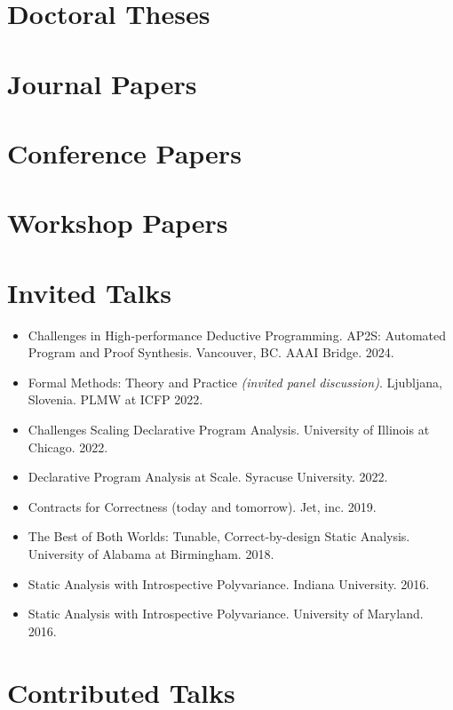 \documentclass[line]{res}
\begin{document}
\begin{resume}
\section{\large Doctoral Theses} \vspace{0.3cm}

\vspace{-0.4cm}

\section{\large Journal Papers} \vspace{0.3cm}

\vspace{-0.4cm}

\section{\large Conference Papers} \vspace{0.3cm}

\vspace{-0.4cm}

\section{\large Workshop Papers} \vspace{0.3cm}

\vspace{-0.4cm}

\section{\large Invited Talks} \vspace{0.2in}
\begin{itemize}
\item Challenges in High-performance Deductive Programming. AP2S: Automated Program and Proof Synthesis. Vancouver, BC. AAAI Bridge. 2024. 
\item Formal Methods: Theory and Practice \textit{(invited panel discussion)}. Ljubljana, Slovenia. PLMW at ICFP 2022.
\item Challenges Scaling Declarative Program Analysis. University of Illinois at Chicago. 2022.
\item Declarative Program Analysis at Scale. Syracuse University. 2022.
\item Contracts for Correctness (today and tomorrow). Jet, inc. 2019.
\item The Best of Both Worlds: Tunable, Correct-by-design Static Analysis. University of Alabama at Birmingham. 2018.
\item Static Analysis with Introspective Polyvariance. Indiana University. 2016.
\item Static Analysis with Introspective Polyvariance. University of Maryland. 2016.
\end{itemize}

\section{\large Contributed Talks} \vspace{0.2in}



\end{resume}

\end{document}
